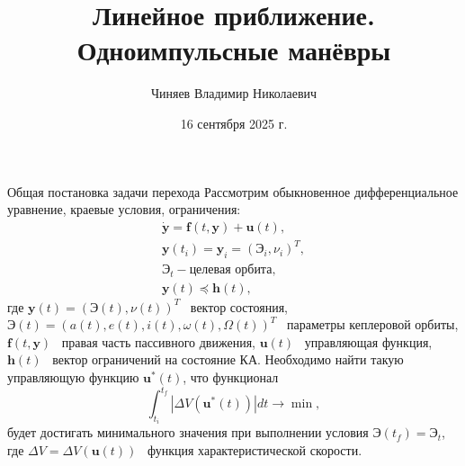 \documentclass[9pt]{beamer}
\author[Автор]{Чиняев Владимир Николаевич}
\title{Линейное приближение. Одноимпульсные манёвры}
\institute[]{Московский физико технический институт}
\date{16 сентября 2025 г.}
\begin{document}
\begin{frame}
\titlepage
\end{frame}

\begin{frame}{Общая постановка задачи перехода}
Рассмотрим обыкновенное дифференциальное уравнение, краевые условия, ограничения:
\begin{gather*}
    \dot{\mathbf{y}} = \mathbf{f}(t, \mathbf{y}) + \mathbf{u}(t), \\
    \mathbf{y}(t_i) = \mathbf{y}_i = \left( \textbf{Э}_i, \nu_i \right)^T, \\
    \textbf{Э}_t - \text{целевая орбита}, \\
    \mathbf{y}(t) \preceq \mathbf{h}(t),
\end{gather*}
где $\mathbf{y}(t) = \left( \textbf{Э}(t), \nu(t) \right)^T$ \textemdash\ вектор состояния, $\textbf{Э}(t)=\left( a(t), e(t), i(t), \omega(t), \Omega(t) \right)^T$ \textemdash\ параметры кеплеровой орбиты, $\mathbf{f}(t, \mathbf{y})$ \textemdash\ правая часть пассивного движения, $\mathbf{u}(t)$ \textemdash\ управляющая функция, $\mathbf{h}(t)$ \textemdash\ вектор ограничений на состояние КА. Необходимо найти такую управляющую функцию $\mathbf{u}^*(t)$, что функционал 
\begin{equation*}
    \int_{t_i}^{t_f} |\Delta V(\mathbf{u}^*(t))| dt \to \min,
\end{equation*}
будет достигать минимального значения при выполнении условия $\textbf{Э}(t_f)=\textbf{Э}_t$, где $\Delta V = \Delta V(\mathbf{u}(t))$ \textemdash\ функция характеристической скорости.
\end{frame}
\end{document}
